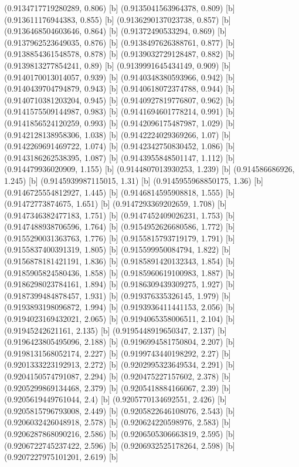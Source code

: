 {{{(0.9134717719280289, 0.806) [b] 
(0.9135041563964378, 0.809) [b] 
(0.913611176944383, 0.855) [b] 
(0.9136290137023738, 0.857) [b] 
(0.9136468504603646, 0.864) [b] 
(0.91372490533294, 0.869) [b] 
(0.9137962523649035, 0.876) [b] 
(0.9138497626388761, 0.877) [b] 
(0.9138854361548578, 0.878) [b] 
(0.9139032729128487, 0.882) [b] 
(0.9139813277854241, 0.89) [b] 
(0.9139991645434149, 0.909) [b] 
(0.9140170013014057, 0.939) [b] 
(0.9140348380593966, 0.942) [b] 
(0.9140439704794879, 0.943) [b] 
(0.9140618072374788, 0.944) [b] 
(0.9140710381203204, 0.945) [b] 
(0.9140927819776807, 0.962) [b] 
(0.9141575509144987, 0.983) [b] 
(0.9141694601778214, 0.991) [b] 
(0.9141856524120259, 0.993) [b] 
(0.9142096175487987, 1.029) [b] 
(0.9142128138958306, 1.038) [b] 
(0.9142224029369266, 1.07) [b] 
(0.9142269691469722, 1.074) [b] 
(0.9142342750830452, 1.086) [b] 
(0.9143186262538395, 1.087) [b] 
(0.9143955848501147, 1.112) [b] 
(0.914479936020909, 1.155) [b] 
(0.9144807013930253, 1.239) [b] 
(0.914586686926, 1.245) [b] 
(0.9145939987115015, 1.31) [b] 
(0.9145955968850175, 1.36) [b] 
(0.9146725554812927, 1.445) [b] 
(0.9146814595908818, 1.555) [b] 
(0.91472773874675, 1.651) [b] 
(0.9147293369202659, 1.708) [b] 
(0.9147346382477183, 1.751) [b] 
(0.9147452409026231, 1.753) [b] 
(0.9147488938706596, 1.764) [b] 
(0.9154952626680586, 1.772) [b] 
(0.9155290031363763, 1.776) [b] 
(0.9155815793719179, 1.791) [b] 
(0.9155837400391319, 1.805) [b] 
(0.915599950084794, 1.822) [b] 
(0.9156878181421191, 1.836) [b] 
(0.9185891420132343, 1.854) [b] 
(0.9185905824580436, 1.858) [b] 
(0.9185960619100983, 1.887) [b] 
(0.9186298023784161, 1.894) [b] 
(0.9186309439309275, 1.927) [b] 
(0.9187399484878457, 1.931) [b] 
(0.919376335326145, 1.979) [b] 
(0.9193893198096872, 1.994) [b] 
(0.9193936411441153, 2.056) [b] 
(0.9194023169432021, 2.065) [b] 
(0.9194065358006511, 2.104) [b] 
(0.91945242621161, 2.135) [b] 
(0.9195448919650347, 2.137) [b] 
(0.9196423805495096, 2.188) [b] 
(0.9196994581750804, 2.207) [b] 
(0.9198131568052174, 2.227) [b] 
(0.9199743440198292, 2.27) [b] 
(0.9201333223192913, 2.272) [b] 
(0.9202995323649534, 2.291) [b] 
(0.9204150574791087, 2.294) [b] 
(0.920475227157602, 2.378) [b] 
(0.9205299869134468, 2.379) [b] 
(0.9205418884166067, 2.39) [b] 
(0.9205619449761044, 2.4) [b] 
(0.9205770134692551, 2.426) [b] 
(0.9205815796793008, 2.449) [b] 
(0.9205822646108076, 2.543) [b] 
(0.9206032426048918, 2.578) [b] 
(0.920624220598976, 2.583) [b] 
(0.9206287868090216, 2.586) [b] 
(0.9206505306663819, 2.595) [b] 
(0.9206722745237422, 2.596) [b] 
(0.9206932525178264, 2.598) [b] 
(0.9207227975101201, 2.619) [b] 
}}}
